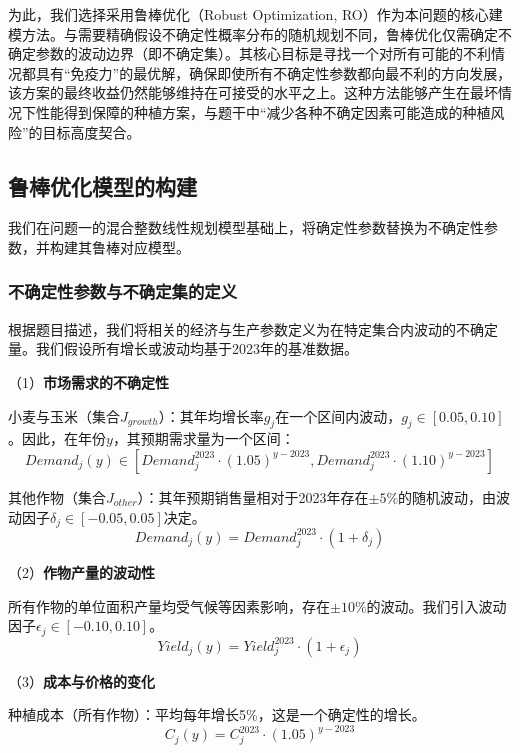 \documentclass[withoutpreface,bwprint]{cumcmthesis} %
\begin{document}
为此，我们选择采用鲁棒优化（Robust Optimization,
RO）作为本问题的核心建模方法。与需要精确假设不确定性概率分布的随机规划不同，鲁棒优化仅需确定不确定参数的波动边界（即不确定集）。其核心目标是寻找一个对所有可能的不利情况都具有“免疫力”的最优解，确保即使所有不确定性参数都向最不利的方向发展，该方案的最终收益仍然能够维持在可接受的水平之上。这种方法能够产生在最坏情况下性能得到保障的种植方案，与题干中“减少各种不确定因素可能造成的种植风险”的目标高度契合。

\subsection{鲁棒优化模型的构建}

我们在问题一的混合整数线性规划模型基础上，将确定性参数替换为不确定性参数，并构建其鲁棒对应模型。

\subsubsection{不确定性参数与不确定集的定义}

根据题目描述，我们将相关的经济与生产参数定义为在特定集合内波动的不确定量。我们假设所有增长或波动均基于2023年的基准数据。

（1）\textbf{市场需求的不确定性}


小麦与玉米（集合$J_{growth}$）：其年均增长率$g_j$在一个区间内波动，$g_j \in [0.05, 0.10]$。因此，在年份$y$，其预期需求量为一个区间：
\begin{equation}
	Demand_j(y) \in [Demand_j^{2023} \cdot (1.05)^{y-2023}, Demand_j^{2023} \cdot (1.10)^{y-2023}]
\end{equation}

其他作物（集合$J_{other}$）：其年预期销售量相对于2023年存在$\pm5\%$的随机波动，由波动因子$\delta_j \in [-0.05, 0.05]$决定。
\begin{equation}
	Demand_j(y) = Demand_j^{2023} \cdot (1 + \delta_j)
\end{equation}


（2）\textbf{作物产量的波动性}


所有作物的单位面积产量均受气候等因素影响，存在$\pm10\%$的波动。我们引入波动因子$\epsilon_j \in [-0.10, 0.10]$。
\begin{equation}
	Yield_j(y) = Yield_j^{2023} \cdot (1 + \epsilon_j)
\end{equation}


（3）\textbf{成本与价格的变化}


种植成本（所有作物）：平均每年增长5\%，这是一个确定性的增长。
\begin{equation}
	C_j(y) = C_j^{2023} \cdot (1.05)^{y-2023}
\end{equation}
\end{document}
